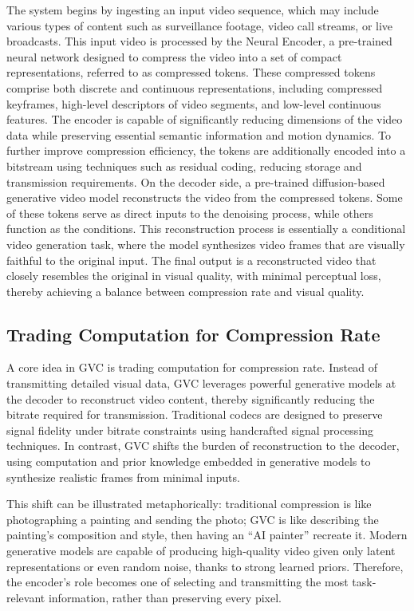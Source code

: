 \documentclass{fairmeta}
\begin{document}
The system begins by ingesting an input video sequence, which may include various types of content such as surveillance footage, video call streams, or live broadcasts. This input video is processed by the Neural Encoder, a pre-trained neural network designed to compress the video into a set of compact representations, referred to as compressed tokens.
%
These compressed tokens comprise both discrete and continuous representations, including compressed keyframes, high-level descriptors of video segments, and low-level continuous features. The encoder is capable of significantly reducing dimensions of the video data while preserving essential semantic information and motion dynamics. To further improve compression efficiency, the tokens are additionally encoded into a bitstream using techniques such as residual coding, reducing storage and transmission requirements. 
%
On the decoder side, a pre-trained diffusion-based generative video model reconstructs the video from the compressed tokens. Some of these tokens serve as direct inputs to the denoising process, while others function as the conditions. This reconstruction process is essentially a conditional video generation task, where the model synthesizes video frames that are visually faithful to the original input.
%
The final output is a reconstructed video that closely resembles the original in visual quality, with minimal perceptual loss, thereby achieving a balance between compression rate and visual quality.

\subsection{Trading Computation for Compression Rate}
A core idea in GVC is trading computation for compression rate. Instead of transmitting detailed visual data, GVC leverages powerful generative models at the decoder to reconstruct video content, thereby significantly reducing the bitrate required for transmission. Traditional codecs are designed to preserve signal fidelity under bitrate constraints using handcrafted signal processing techniques. In contrast, GVC shifts the burden of reconstruction to the decoder, using computation and prior knowledge embedded in generative models to synthesize realistic frames from minimal inputs.

This shift can be illustrated metaphorically: traditional compression is like photographing a painting and sending the photo; GVC is like describing the painting’s composition and style, then having an “AI painter” recreate it. Modern generative models are capable of producing high-quality video given only latent representations or even random noise, thanks to strong learned priors. Therefore, the encoder’s role becomes one of selecting and transmitting the most task-relevant information, rather than preserving every pixel.
\end{document}
